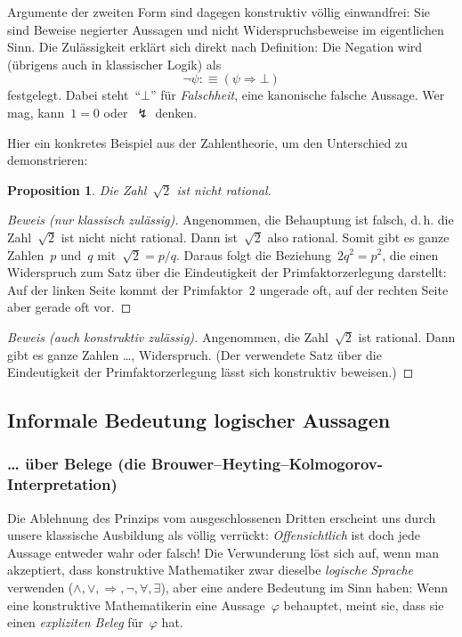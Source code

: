 \documentclass[a4paper,ngerman,12pt]{scrartcl}
\theoremstyle{definition}
\theoremstyle{plain}
\newtheorem{prop}[defn]{Proposition}
\theoremstyle{remark}
\renewcommand{\_}{\mathpunct{.}\,}
\newcommand{\?}{\,{:}\,}
\begin{document}
Argumente der zweiten Form sind dagegen konstruktiv völlig einwandfrei: Sie
sind Beweise negierter Aussagen und nicht Widerspruchsbeweise im eigentlichen
Sinn. Die Zulässigkeit erklärt sich direkt nach Definition:
Die Negation wird (übrigens auch in klassischer Logik) als
\[ \neg\psi :\equiv (\psi \Rightarrow \bot) \]
festgelegt. Dabei steht~"`$\bot$"' für \emph{Falschheit}, eine kanonische falsche
Aussage. Wer mag, kann~$1 = 0$ oder~$\lightning$ denken.

Hier ein konkretes Beispiel aus der Zahlentheorie, um den Unterschied zu
demonstrieren:
\begin{prop}Die Zahl~$\sqrt{2}$ ist nicht rational.\end{prop}
\begin{proof}[Beweis (nur klassisch zulässig)]
Angenommen, die Behauptung ist falsch, d.\,h. die Zahl~$\sqrt{2}$ ist nicht
nicht rational. Dann ist~$\sqrt{2}$ also rational. Somit gibt es ganze
Zahlen~$p$ und~$q$ mit~$\sqrt{2} = p / q$. Daraus folgt die Beziehung~$2q^2 =
p^2$, die einen Widerspruch zum Satz über die Eindeutigkeit der
Primfaktorzerlegung darstellt: Auf der linken Seite kommt der Primfaktor~$2$
ungerade oft, auf der rechten Seite aber gerade oft vor.
\end{proof}
\begin{proof}[Beweis (auch konstruktiv zulässig)]
Angenommen, die Zahl~$\sqrt{2}$ ist rational. Dann gibt es ganze Zahlen \ldots,
Widerspruch. (Der verwendete Satz über die Eindeutigkeit der
Primfaktorzerlegung lässt sich konstruktiv beweisen.)
\end{proof}


\subsection{Informale Bedeutung logischer Aussagen}

\subsubsection*{\ldots{} über Belege (die
Brouwer--Heyting--Kolmogorov-Interpretation)}

Die Ablehnung des Prinzips vom ausgeschlossenen Dritten erscheint uns durch
unsere klassische Ausbildung als völlig verrückt: \emph{Offensichtlich} ist
doch jede Aussage entweder wahr oder falsch! Die Verwunderung löst sich auf,
wenn man akzeptiert, dass konstruktive Mathematiker zwar dieselbe
\emph{logische Sprache} verwenden ($\wedge, \vee, \Rightarrow, \neg, \forall,
\exists$), aber eine andere Bedeutung im Sinn haben: Wenn eine konstruktive
Mathematikerin eine Aussage~$\varphi$ behauptet, meint sie, dass sie einen
\emph{expliziten Beleg} für~$\varphi$ hat.
\end{document}
